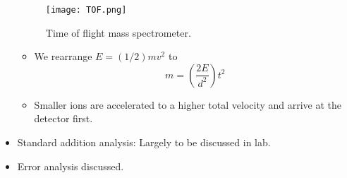 \documentclass[../notes.tex]{subfiles}
\begin{document}
\begin{itemize}
    \begin{figure}[h!]
        \centering
        \texttt{[image: TOF.png]}
        \caption{Time of flight mass spectrometer.}
        \label{fig:TOF}
    \end{figure}
    \begin{itemize}
        \item We rearrange $E=(1/2)mv^2$ to
        \begin{equation*}
            m = \left( \frac{2E}{d^2} \right)t^2
        \end{equation*}
        \item Smaller ions are accelerated to a higher total velocity and arrive at the detector first.
    \end{itemize}
    \item Standard addition analysis: Largely to be discussed in lab.
    \item Error analysis discussed.
\end{itemize}
\end{document}
